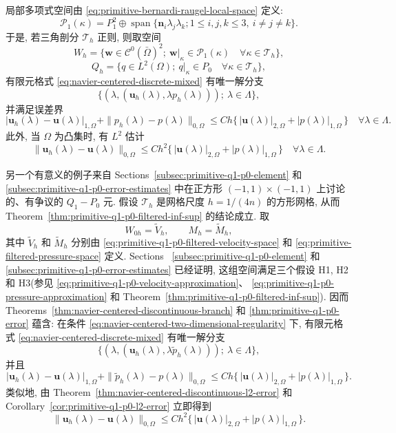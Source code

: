 局部多项式空间由 \eqref{eq:primitive-bernardi-raugel-local-space} 定义:
\[
\mathcal P_1(\kappa)
=P_1^2\oplus\operatorname{span}
\{\boldsymbol n_i\lambda_j\lambda_k;
1\leq i,j,k\leq3,\ i\ne j\ne k\}.
\]
于是, 若三角剖分 $\mathcal T_h$ 正则, 则取空间
\[
W_h=\{\boldsymbol w\in\mathcal C^0(\bar\Omega)^2;
\ \boldsymbol w|_\kappa\in\mathcal P_1(\kappa)
\quad\forall\kappa\in\mathcal T_h\},
\]
\[
Q_h=\{q\in L^2(\Omega);
\ q|_\kappa\in P_0
\quad\forall\kappa\in\mathcal T_h\},
\]
有限元格式 \eqref{eq:navier-centered-discrete-mixed} 有唯一解分支
\[
\{(\lambda,(\boldsymbol u_h(\lambda),\lambda p_h(\lambda)));
\ \lambda\in\Lambda\},
\]
并满足误差界
\[
|\boldsymbol u_h(\lambda)-\boldsymbol u(\lambda)|_{1,\Omega}
+\|p_h(\lambda)-p(\lambda)\|_{0,\Omega}
\leq Ch\{\,|\boldsymbol u(\lambda)|_{2,\Omega}
+|p(\lambda)|_{1,\Omega}\,\}
\quad\forall\lambda\in\Lambda.
\]
此外, 当 $\Omega$ 为凸集时, 有 $L^2$ 估计
\[
\|\boldsymbol u_h(\lambda)-\boldsymbol u(\lambda)\|_{0,\Omega}
\leq Ch^2\{\,|\boldsymbol u(\lambda)|_{2,\Omega}
+|p(\lambda)|_{1,\Omega}\,\}
\quad\forall\lambda\in\Lambda.
\]

另一个有意义的例子来自 Sections~\ref{subsec:primitive-q1-p0-element} 和
\ref{subsec:primitive-q1-p0-error-estimates} 中在正方形
$(-1,1)\times(-1,1)$ 上讨论的、有争议的 $Q_1-P_0$ 元. 假设
$\mathcal T_h$ 是网格尺度 $h=1/(4n)$ 的方形网格, 从而
Theorem~\ref{thm:primitive-q1-p0-filtered-inf-sup} 的结论成立. 取
\[
W_{0h}=\widetilde V_h,
\qquad M_h=\widetilde M_h,
\]
其中 $\widetilde V_h$ 和 $\widetilde M_h$ 分别由
\eqref{eq:primitive-q1-p0-filtered-velocity-space} 和
\eqref{eq:primitive-filtered-pressure-space} 定义. Sections~
\ref{subsec:primitive-q1-p0-element} 和
\ref{subsec:primitive-q1-p0-error-estimates} 已经证明, 这组空间满足三个假设
H1, H2 和 H3(参见 \eqref{eq:primitive-q1-p0-velocity-approximation}、
\eqref{eq:primitive-q1-p0-pressure-approximation} 和
Theorem~\ref{thm:primitive-q1-p0-filtered-inf-sup}). 因而
Theorems~\ref{thm:navier-centered-discontinuous-branch} 和
\ref{thm:primitive-q1-p0-error} 蕴含: 在条件
\eqref{eq:navier-centered-two-dimensional-regularity} 下, 有限元格式
\eqref{eq:navier-centered-discrete-mixed} 有唯一解分支
\[
\{(\lambda,(\boldsymbol u_h(\lambda),\lambda\widetilde p_h(\lambda)));
\ \lambda\in\Lambda\},
\]
并且
\[
|\boldsymbol u_h(\lambda)-\boldsymbol u(\lambda)|_{1,\Omega}
+\|\widetilde p_h(\lambda)-p(\lambda)\|_{0,\Omega}
\leq Ch\{\,|\boldsymbol u(\lambda)|_{2,\Omega}
+|p(\lambda)|_{1,\Omega}\,\}.
\]
类似地, 由 Theorem~\ref{thm:navier-centered-discontinuous-l2-error} 和
Corollary~\ref{cor:primitive-q1-p0-l2-error} 立即得到
\[
\|\boldsymbol u_h(\lambda)-\boldsymbol u(\lambda)\|_{0,\Omega}
\leq Ch^2\{\,|\boldsymbol u(\lambda)|_{2,\Omega}
+|p(\lambda)|_{1,\Omega}\,\}.
\]

